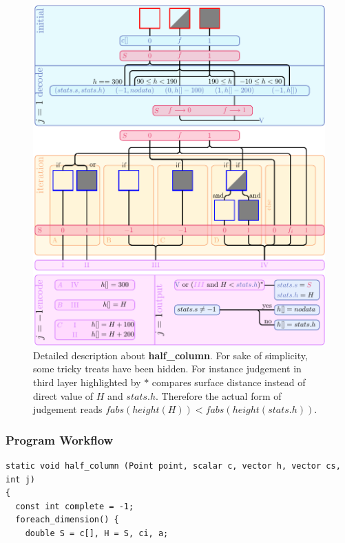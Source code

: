 \documentclass[a4paper]{article}
\newcommand{\func}[1]{\textbf{\textcolor{function}{#1}}}
\newcommand{\para}[1]{\textbf{\emph{\textcolor{para}{#1}}}}
\begin{document}
\begin{figure}
    \centering
    \includegraphics[width=\textwidth]{image/column.pdf}
    \caption{Detailed description about \func{half\_column}. For sake of simplicity, some tricky treats have been hidden. For instance judgement in third layer highlighted by $\ast$ compares surface distance instead of direct value of $H$ and $stats.h$. Therefore the actual form of judgement reads $fabs(height(H))<fabs(height(stats.h))$.}
    \label{fig:column}
\end{figure}
\newpage
\subsubsection{Program Workflow}
\begin{multicols}{2}
 \columnbreak
 \begin{verbatim}
static void half_column (Point point, scalar c, vector h, vector cs, int j)
{
  const int complete = -1;
  foreach_dimension() {
    double S = c[], H = S, ci, a;
 \end{verbatim}
 
\end{multicols}
\end{document}
